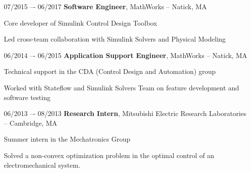 \begin{twocolentry}{07/2015 –- 06/2017}
    \textbf{Software Engineer}, MathWorks -- Natick, MA\end{twocolentry}
\vspace{0.10 cm}
\begin{onecolentry}
    \begin{highlights}
        \item Core developer of Simulink Control Design Toolbox
        \item Led cross-team collaboration with Simulink Solvers and Physical Modeling
    \end{highlights}
\end{onecolentry}
\vspace{0.25 cm}

\begin{twocolentry}{06/2014 –- 06/2015}
    \textbf{Application Support Engineer}, MathWorks -- Natick, MA\end{twocolentry}
\vspace{0.10 cm}
\begin{onecolentry}
    \begin{highlights}
        \item Technical support in the CDA (Control Design and Automation) group
        \item Worked with Stateflow and Simulink Solvers Team on feature development and software testing
    \end{highlights}
\end{onecolentry}
\vspace{0.25 cm}

\begin{twocolentry}{06/2013 –- 08/2013}
    \textbf{Research Intern}, Mitsubishi Electric Research Laboratories -- Cambridge, MA\end{twocolentry}
\vspace{0.10 cm}
\begin{onecolentry}
    \begin{highlights}
        \item Summer intern in the Mechatronics Group
        \item Solved a non-convex optimization problem in the optimal control of an electromechanical system.
    \end{highlights}
\end{onecolentry}
\vspace{0.25 cm}

